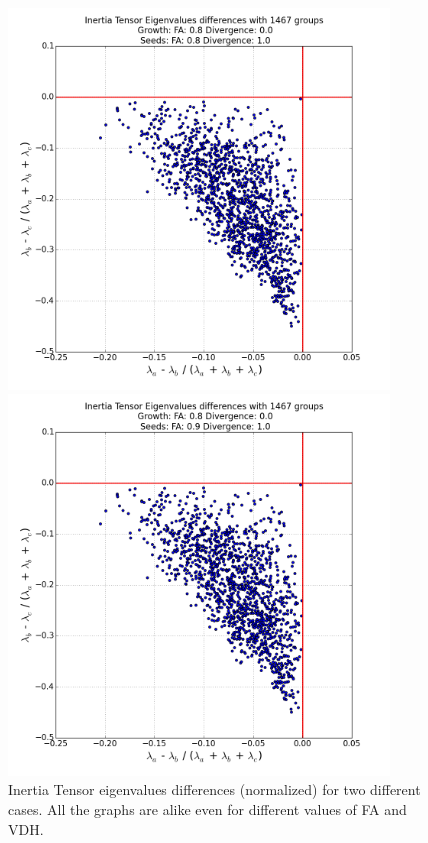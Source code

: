 \documentclass[12pt]{article}
\begin{document}
\begin{figure}[ht]
\centering
\begin{minipage}{.5\textwidth}
  \centering
  \includegraphics[width=0.9\textwidth]{groups/inertiaplots/inertia_diff_08_Trace_10_search_FA_08_Trace_00.png} %
\end{minipage}%
\begin{minipage}{.5\textwidth}
  \centering
  \includegraphics[width=0.9\textwidth]{groups/inertiaplots/inertia_diff_09_Trace_10_search_FA_08_Trace_00.png}
\end{minipage}
\caption{Inertia Tensor eigenvalues differences (normalized) for two different cases. All the graphs are alike even for different values of FA and VDH.}
\label{fg:inertia_diff}
\end{figure}
\end{document}
